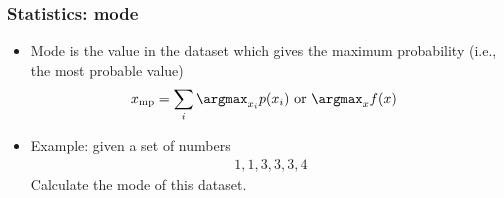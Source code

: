 \documentclass[aspectratio=169,xcolor={dvipsnames}]{beamer}
\begin{document}
\begin{frame}[t]
    \frametitle{Statistics: mode}
    \begin{itemize}
        \item Mode is the value in the dataset which gives the maximum probability
            (i.e., the most probable value)
            \begin{align}
                x_\text{mp} &= \sum_i \argmax_{x_i} p(x_i) \text{ or }
                \argmax_x f(x)
            \end{align}
        \item Example: given a set of numbers
            \begin{align*}
                1, 1, 3, 3, 3, 4
            \end{align*}
            Calculate the mode of this dataset.
    \end{itemize}
\end{frame}
\end{document}
